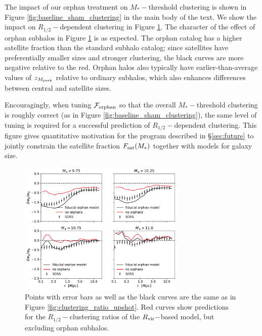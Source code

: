 \documentclass[usenatbib,usegraphicx,letterpaper]{mn2e}
\newcommand{\rhalf}{R_{1/2}}
\newcommand{\mstar}{M_{\ast}}
\newcommand{\zpeak}{z_{M_{\rm peak}}}
\newcommand{\rvir}{R_{\rm vir}}
\begin{document}
The impact of our orphan treatment on $\mstar-$threshold clustering is shown in Figure \ref{fig:baseline_sham_clustering} in the main body of the text. We show the impact on $\rhalf-$dependent clustering in Figure \ref{fig:orphan_clustering_ratios}. The character of the effect of orphan subhalos in Figure \ref{fig:orphan_clustering_ratios} is as expected. The orphan catalog has a higher satellite fraction than the standard subhalo catalog; since satellites have preferentially smaller sizes and stronger clustering, the black curves are more negative relative to the red. Orphan halos also typically have earlier-than-average values of $\zpeak$ relative to ordinary subhalos, which also enhances differences between central and satellite sizes.

Encouragingly, when tuning $\mathcal{F}_{\rm orphan}$ so that the overall $\mstar-$threshold clustering is roughly correct (as in Figure \ref{fig:baseline_sham_clustering}), the same level of tuning is required for a successful prediction of $\rhalf-$dependent clustering. This figure gives quantitative motivation for the program described in \S\ref{sec:future} to jointly constrain the satellite fraction $F_{\rm sat}(\mstar)$ together with models for galaxy size.

\begin{figure}
\centering
\includegraphics[width=8cm]{FIGS/clustering_ratios_orphan_impact.pdf}
\caption{
Points with error bars as well as the black curves are the same as in Figure \ref{fig:clustering_ratio_upshot}. Red curves show predictions for the $\rhalf-$clustering ratios of the $\rvir-$based model, but excluding orphan subhalos.
}
\label{fig:orphan_clustering_ratios}
\end{figure}
\end{document}
